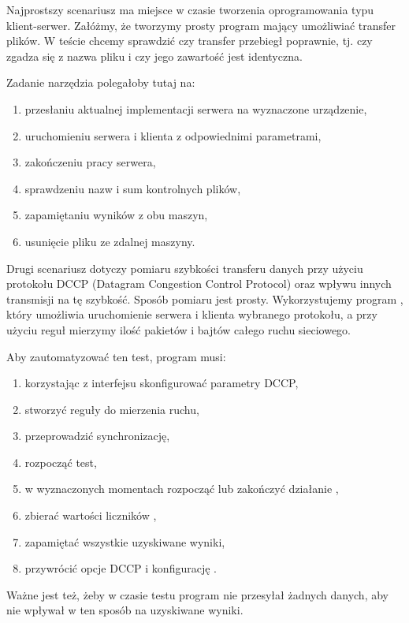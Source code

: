 \documentclass[00-praca-magisterska.tex]{subfiles}
\begin{document}

Najprostszy scenariusz ma miejsce w czasie tworzenia oprogramowania typu
klient-serwer. Załóżmy, że tworzymy prosty program mający umożliwiać transfer
plików. W teście chcemy sprawdzić czy transfer przebiegł poprawnie, tj. czy
zgadza się z nazwa pliku i czy jego zawartość jest identyczna.

Zadanie narzędzia polegałoby tutaj na:
\begin{enumerate}
\item przesłaniu aktualnej implementacji serwera na wyznaczone urządzenie,
\item uruchomieniu serwera i klienta z odpowiednimi parametrami,
\item zakończeniu pracy serwera,
\item sprawdzeniu nazw i sum kontrolnych plików,
\item zapamiętaniu wyników z obu maszyn,
\item usunięcie pliku ze zdalnej maszyny.
\end{enumerate}

Drugi scenariusz dotyczy pomiaru szybkości transferu danych przy użyciu
protokołu DCCP (Datagram Congestion Control Protocol) oraz wpływu innych
transmisji na tę szybkość. Sposób pomiaru jest prosty. Wykorzystujemy program
, który umożliwia uruchomienie serwera i klienta wybranego
protokołu, a przy użyciu reguł  mierzymy ilość pakietów i bajtów
całego ruchu sieciowego.

Aby zautomatyzować ten test, program musi:
\begin{enumerate}
\item korzystając z interfejsu  skonfigurować parametry DCCP,
\item stworzyć reguły  do mierzenia ruchu,
\item przeprowadzić synchronizację, 
\item rozpocząć test,
\item w wyznaczonych momentach rozpocząć lub zakończyć działanie ,
\item zbierać wartości liczników ,
\item zapamiętać wszystkie uzyskiwane wyniki,
\item przywrócić opcje DCCP i konfigurację .
\end{enumerate}

Ważne jest też, żeby w czasie testu program nie przesyłał żadnych danych, aby
nie wpływał w ten sposób na uzyskiwane wyniki.
\end{document}
